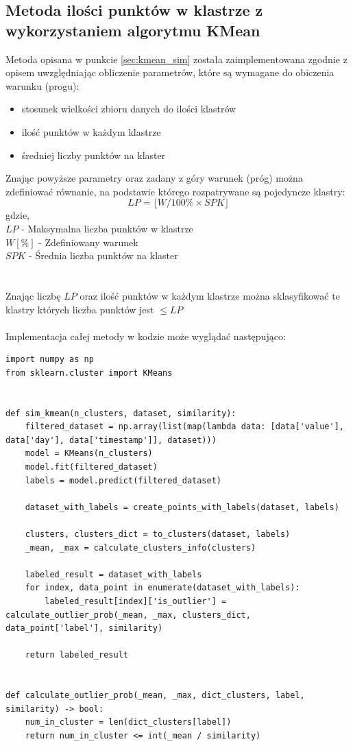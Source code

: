\documentclass[eng,printmode]{mgr}
\begin{document}
\subsection{Metoda ilości punktów w klastrze z wykorzystaniem algorytmu KMean}
Metoda opisana w punkcie \ref{sec:kmean_sim} została zaimplementowana zgodnie z opisem uwzględniając obliczenie parametrów, które są wymagane do obiczenia warunku (progu):
\begin{itemize}
	\item stosunek wielkości zbioru danych do ilości klastrów
	\item ilość punktów w każdym klastrze
	\item średniej liczby punktów na klaster
\end{itemize}
Znając powyższe parametry oraz zadany z góry warunek (próg) można zdefiniować równanie, na podstawie którego rozpatrywane są pojedyncze klastry:
\\
\begin{equation*}
LP = \lfloor W / 100\% \times SPK  \rfloor
\end{equation*}
gdzie,\\
$LP$ - Maksymalna liczba punktów w klastrze \\
$W[\%]$ - Zdefiniowany warunek \\
$SPK$ - Średnia liczba punktów na klaster \\
\\\\
Znając liczbę $LP$ oraz ilość punktów w każdym klastrze można sklasyfikować te klastry których liczba punktów jest $\le LP$
\\\\
Implementacja całej metody w kodzie może wyglądać następująco:
\\
\begin{lstlisting}
import numpy as np
from sklearn.cluster import KMeans


def sim_kmean(n_clusters, dataset, similarity):
    filtered_dataset = np.array(list(map(lambda data: [data['value'],       data['day'], data['timestamp']], dataset)))
    model = KMeans(n_clusters)
    model.fit(filtered_dataset)
    labels = model.predict(filtered_dataset)

    dataset_with_labels = create_points_with_labels(dataset, labels)

    clusters, clusters_dict = to_clusters(dataset, labels)
    _mean, _max = calculate_clusters_info(clusters)

    labeled_result = dataset_with_labels
    for index, data_point in enumerate(dataset_with_labels):
        labeled_result[index]['is_outlier'] = calculate_outlier_prob(_mean, _max, clusters_dict, data_point['label'], similarity)

    return labeled_result


def calculate_outlier_prob(_mean, _max, dict_clusters, label, similarity) -> bool:
    num_in_cluster = len(dict_clusters[label])
    return num_in_cluster <= int(_mean / similarity)
\end{lstlisting}
\end{document}
